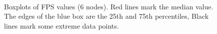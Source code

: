 \documentclass[journal]{IEEEtran}  %
\begin{document}
\begin{figure}[t]
\centering
{}
  ~ %
\caption{Boxplots of FPS values (6 nodes).
Red lines mark the median value. The edges of the blue box are the
  25th and 75th percentiles, Black lines mark some extreme data points.}
\label{fig:fps_biased}
\end{figure}
\end{document}

